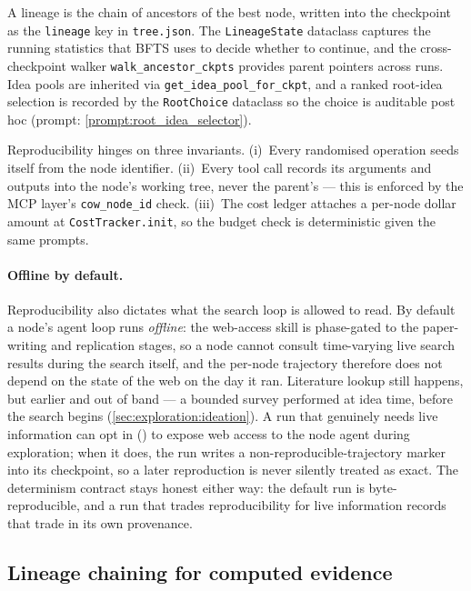 A lineage is the chain of ancestors of the best node, written into
the checkpoint as the \texttt{lineage} key in \texttt{tree.json}.
The \texttt{LineageState} dataclass captures the running statistics
that BFTS uses to decide whether to continue, and the cross-checkpoint
walker \texttt{walk\_ancestor\_ckpts} provides parent pointers across
runs. Idea pools are inherited via \texttt{get\_idea\_pool\_for\_ckpt},
and a ranked root-idea selection is recorded by the
\texttt{RootChoice} dataclass so the choice is auditable post hoc
(prompt: \cref{prompt:root_idea_selector}).

Reproducibility hinges on three invariants. (i)~Every randomised
operation seeds itself from the node identifier. (ii)~Every tool
call records its arguments and outputs into the node's working tree,
never the parent's --- this is enforced by the MCP layer's
\texttt{cow\_node\_id} check. (iii)~The cost ledger attaches a
per-node dollar amount at \texttt{CostTracker.init}, so the budget
check is deterministic given the same prompts.

\paragraph{Offline by default.}
Reproducibility also dictates what the search loop is allowed to read.
By default a node's agent loop runs \emph{offline}: the web-access skill
is phase-gated to the paper-writing and replication stages, so a node
cannot consult time-varying live search results during the search itself,
and the per-node trajectory therefore does not depend on the state of the
web on the day it ran. Literature lookup still happens, but earlier and
out of band --- a bounded survey performed at idea time, before the
search begins (\cref{sec:exploration:ideation}). A run that genuinely
needs live information can opt in
() to expose web access to the node agent during
exploration; when it does, the run writes a non-reproducible-trajectory
marker into its checkpoint, so a later reproduction is never silently
treated as exact. The determinism contract stays honest either way: the
default run is byte-reproducible, and a run that trades reproducibility
for live information records that trade in its own provenance.

\subsection{Lineage chaining for computed evidence}\label{sec:exploration:lineage-chaining}


